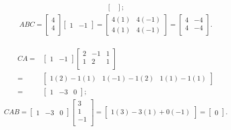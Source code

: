 \documentclass[12pt]{article}
\begin{document}
\begin{enumerate}
\begin{align*}
\begin{bmatrix}
      \end{bmatrix};
    \end{align*}
    \begin{align*}
      ABC =
      \begin{bmatrix}
        4\\
        4\\
      \end{bmatrix}
      \begin{bmatrix}
        1 & -1
      \end{bmatrix}
      =
      \begin{bmatrix}
        4(1) & 4(-1)\\
        4(1) & 4(-1)
      \end{bmatrix}
      =
      \begin{bmatrix}
        4 & -4\\
        4 & -4\\
      \end{bmatrix}.
    \end{align*}\\
    \begin{align*}
      CA =&
      \begin{bmatrix}
        1 & -1
      \end{bmatrix}
      \begin{bmatrix}
        2 & -1 & 1\\
        1 &  2 & 1\\
      \end{bmatrix}\\
      =&
      \begin{bmatrix}
        1(2) - 1(1) & 1(-1) - 1(2) & 1(1) - 1(1)
      \end{bmatrix}\\
      =&
      \begin{bmatrix}
        1 & -3 & 0
      \end{bmatrix};
    \end{align*}
    \begin{align*}
      CAB =
      \begin{bmatrix}
        1 & -3 & 0
      \end{bmatrix}
      \begin{bmatrix}
         3\\
         1\\
        -1\\
      \end{bmatrix}
      =
      \begin{bmatrix}
        1(3) - 3(1) + 0(-1)
      \end{bmatrix}
      =
      \begin{bmatrix}
        0
      \end{bmatrix}.
    \end{align*}


\end{enumerate}
\end{document}
